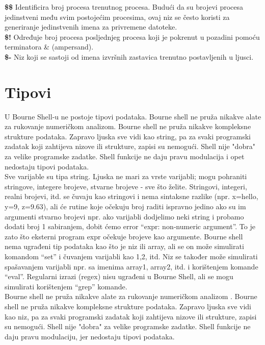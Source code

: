 \documentclass[11pt]{book}
\begin{document}
\textbf{\$\$} Identificira broj procesa trenutnog procesa. Budući da su brojevi procesa jedinstveni među svim postojećim procesima, ovaj niz se često koristi za generiranje jedinstvenih imena za privremene datoteke.\\

\textbf{\$!} Određuje broj procesa posljednjeg procesa koji je pokrenut u pozadini pomoću terminatora \& (ampersand).\\

\textbf{\$-} Niz koji se sastoji od imena izvršnih zastavica trenutno postavljenih u ljusci.


\section{Tipovi}

U Bourne Shell‐u ne postoje tipovi podataka. Bourne shell ne pruža nikakve alate za rukovanje numeričkom analizom. Bourne shell ne pruža nikakve kompleksne strukture podataka. Zapravo ljuska sve vidi kao string, pa za svaki programski zadatak koji zahtijeva nizove ili strukture, zapisi su nemogući. Shell nije "dobra" za velike programske zadatke. Shell funkcije ne daju pravu modulacija i opet nedostaju tipovi podataka.\\

Sve varijable su tipa string. Ljuska ne mari za vrste varijabli; mogu pohraniti stringove, integere brojeve, stvarne brojeve - sve što želite. Stringovi, integeri, realni brojevi, itd. se čuvaju kao stringovi i nema sintaksne razlike (npr. x=hello, y=9, z=9.63), ali će rutine koje očekuju broj raditi ispravno jedino ako su im argumenti stvarno brojevi npr. ako varijabli dodjelimo neki string i probamo dodati broj 1 sabiranjem, dobit ćemo error “expr: non‐numeric argument”. To je zato što eksterni program expr očekuje brojeve kao argumente. Bourne shell nema ugrađeni tip podataka kao što je niz ili array, ali se on može simulirati komandom “set” i čuvanjem varijabli kao 1,2, itd. Niz se također može simulirati spašavanjem varijabli npr. sa imenima array1, array2, itd. i korištenjem komande “eval”. Regularni izrazi (regex) nisu ugrađeni u Bourne Shell, ali se mogu simulirati korištenjem “grep” komande.\\

Bourne shell ne pruža nikakve alate za rukovanje numeričkom analizom . Bourne shell ne pruža nikakve kompleksne strukture podataka. Zapravo ljuska sve vidi kao niz, pa za svaki programski zadatak koji zahtijeva nizove ili strukture, zapisi su nemogući. Shell nije "dobra" za velike programske zadatke. Shell funkcije ne daju pravu modulaciju, jer nedostaju tipovi podataka.
\end{document}
